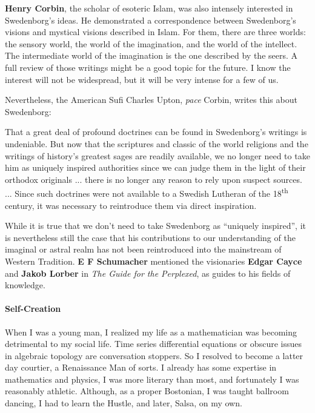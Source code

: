 \textbf{Henry Corbin}, the scholar of esoteric Islam, was also intensely interested in Swedenborg's ideas. He demonstrated a correspondence between Swedenborg's visions and mystical visions described in Islam. For them, there are three worlds: the sensory world, the world of the imagination, and the world of the intellect. The intermediate world of the imagination is the one described by the seers. A full review of those writings might be a good topic for the future. I know the interest will not be widespread, but it will be very intense for a few of us.

Nevertheless, the American Sufi Charles Upton, \emph{pace} Corbin, writes this about Swedenborg:

\begin{quotex}
That a great deal of profound doctrines can be found in Swedenborg's writings is undeniable. But now that the scriptures and classic of the world religions and the writings of history's greatest sages are readily available, we no longer need to take him as uniquely inspired authorities since we can judge them in the light of their orthodox originals ... there is no longer any reason to rely upon suspect sources. ... Since such doctrines were not available to a Swedish Lutheran of the 18\textsuperscript{th} century, it was necessary to reintroduce them via direct inspiration.
\end{quotex}


While it is true that we don't need to take Swedenborg as ``uniquely inspired'', it is nevertheless still the case that his contributions to our understanding of the imaginal or astral realm has not been reintroduced into the mainstream of Western Tradition. \textbf{E F Schumacher} mentioned the visionaries \textbf{Edgar Cayce} and \textbf{Jakob Lorber} in \emph{The Guide for the Perplexed}, as guides to his fields of knowledge.

\paragraph{Self-Creation}

When I was a young man, I realized my life as a mathematician was becoming detrimental to my social life. Time series differential equations or obscure issues in algebraic topology are conversation stoppers. So I resolved to become a latter day courtier, a Renaissance Man of sorts. I already has some expertise in mathematics and physics, I was more literary than most, and fortunately I was reasonably athletic. Although, as a proper Bostonian, I was taught ballroom dancing, I had to learn the Hustle, and later, Salsa, on my own.

